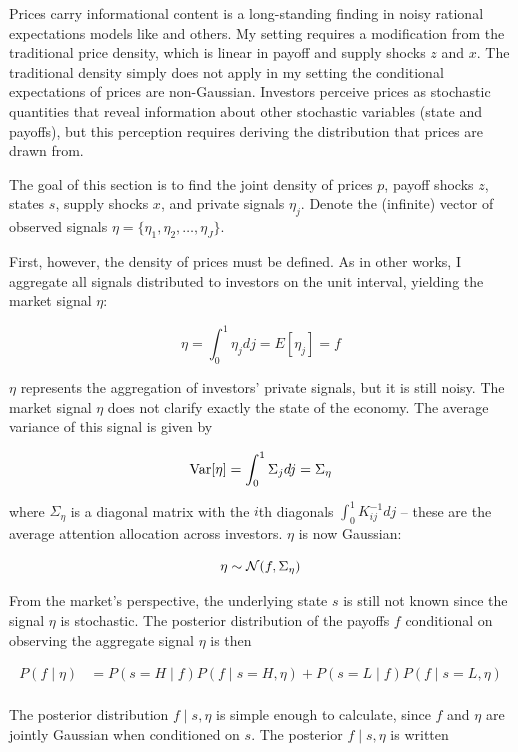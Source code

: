 \documentclass{article}
\begin{document}
Prices carry informational content is a long-standing finding in noisy rational expectations models like \textcite{admati_noisy_1985} and others. My setting requires a modification from the traditional price density, which is linear in payoff and supply shocks $z$ and $x$. The traditional density simply does not apply in my setting the conditional expectations of prices are non-Gaussian. Investors perceive prices as stochastic quantities that reveal information about other stochastic variables (state and payoffs), but this perception requires deriving the distribution that prices are drawn from.

The goal of this section is to find the joint density of prices $p$, payoff shocks $z$, states $s$, supply shocks $x$, and private signals $\eta_j$. Denote the (infinite) vector of observed signals $\eta = \{\eta_1, \eta_2, \dots, \eta_J\}$.

First, however, the density of prices must be defined. As in other works, I aggregate all signals distributed to investors on the unit interval, yielding the market signal $\eta$:

$$
\eta = \int_0^1 \eta_j dj = E[\eta_j] = f
$$

\noindent $\eta$ represents the aggregation of investors' private signals, but it is still noisy. The market signal $\eta$ does not clarify exactly the state of the economy. The average variance of this signal is given by

$$
\text{Var}[\eta] = \int_0^1 \Sigma_j dj = \Sigma_\eta
$$

\noindent where $\Sigma_\eta$ is a diagonal matrix with the $i$th diagonals $\int_0^1 K^{-1}_{ij} dj$ -- these are the average attention allocation across investors. $\eta$ is now Gaussian:

$$
\eta \sim \mathcal{N}(f, \Sigma_\eta)
$$

From the market's perspective, the underlying state $s$ is still not known since the signal $\eta$ is stochastic. The posterior distribution of the payoffs $f$ conditional on observing the aggregate signal $\eta$ is then

\begin{align*}
    P(f \mid \eta) &= P(s=H\mid f) P(f \mid s=H, \eta) + P(s=L\mid f) P(f \mid s=L, \eta) \\
\end{align*}

\noindent The posterior distribution $f \mid s, \eta$ is simple enough to calculate, since $f$ and $\eta$ are jointly Gaussian when conditioned on $s$. The posterior $f \mid s, \eta$ is written
\end{document}
